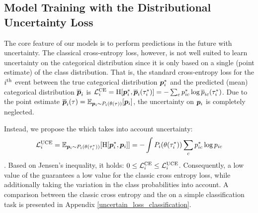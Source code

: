 \subsection{Model Training with the Distributional Uncertainty Loss}
\label{uncertainty_loss}

The core feature of our models is to perform predictions in the future with uncertainty.
The classical cross-entropy loss, however, is not well suited to learn uncertainty on the categorical distribution since it is only based on a single (point estimate) of the class distribution. That is, the standard cross-entropy loss for the $i^{\text{th}}$ event between the true categorical distribution $\bm{p}_{i}^{*}$ and the predicted (mean) categorical distribution $\overline{\bm{p}}_{i}$ is
$\mathcal{L}_{i}^{\text{CE}} = \operatorname{H}[\bm{p}_{i}^*, \overline{\bm{p}}_{i}(\tau_{i}^*)] = - \sum_c p_{i c}^* \log \overline{p}_{i c}(\tau_{i}^*)$. Due to the point estimate $\overline{\bm{p}}_{i}(\tau) = \operatorname{\mathbb{E}}_{\bm{p}_{i} \sim P_{i}(\theta(\tau))}[\bm{p}_{i}]$, the uncertainty on $\bm{p}_{i}$ is completely neglected.


Instead, we propose the \UncertaintyLoss which takes into account uncertainty:
\begin{equation}\label{eq:loss}
\begin{aligned}
\mathcal{L}_{i}^{\text{UCE}} = \operatorname{\mathbb{E}}_{\bm{p}_{i} \sim P_{i}(\theta(\tau_{i}^*))}[\operatorname{H}[\bm{p}_{i}^*, \bm{p}_{i}]] = - \int P_{i}(\theta(\tau_{i}^*)) \sum_c p_{i c}^* \log p_{i c}
\end{aligned}
\end{equation}
. Based on Jensen's inequality, it holds: $0 \leq \mathcal{L}_{i}^{\text{CE}} \leq \mathcal{L}_{i}^{\text{UCE}}
$. Consequently, a low value of the \UncertaintyLoss guarantees a low value for the classic cross entropy loss, while additionally taking the variation in the class probabilities into account. A comparison between the classic cross entropy and the \UncertaintyLoss on a simple classification task  is presented in Appendix \ref{uncertain_loss_classification}.

